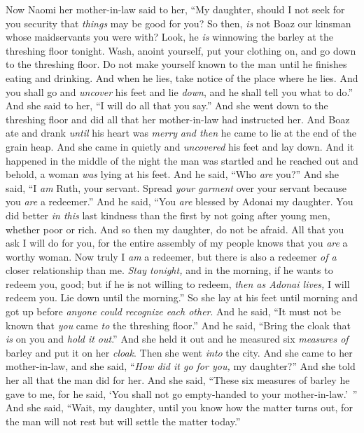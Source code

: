 \begin{biblechapter} %
 Now Naomi her mother-in-law said to her, “My daughter, should I not seek for you security that \textit{things} may be good for you?
\verse So then, \textit{is} not Boaz our kinsman whose maidservants you were with? Look, he \textit{is} winnowing the barley at the threshing floor tonight.
\verse Wash, anoint yourself, put your clothing on, and go down to the threshing floor. Do not make yourself known to the man until he finishes eating and drinking.
\verse And when he lies, take notice of the place where he lies. And you shall go and \textit{uncover} his feet and lie \textit{down}, and he shall tell you what to do.”
\verse And she said to her, “I will do all that you say.”
\verse And she went down to the threshing floor and did all that her mother-in-law had instructed her.
\verse And Boaz ate and drank \textit{until} his heart was \textit{merry} \textit{and then} he came to lie at the end of the grain heap. And she came in quietly and \textit{uncovered} his feet and lay down.
\verse And it happened in the middle of the night the man was startled and he reached out and behold, a woman \textit{was} lying at his feet.
\verse And he said, “Who \textit{are} you?” And she said, “I \textit{am} Ruth, your servant. Spread \textit{your garment} over your servant because you \textit{are} a redeemer.”
\verse And he said, “You \textit{are} blessed by Adonai my daughter. You did better \textit{in this} last kindness than the first by not going after young men, whether poor or rich.
\verse And so then my daughter, do not be afraid. All that you ask I will do for you, for the entire assembly of my people knows that you \textit{are} a worthy woman.
\verse Now truly I \textit{am} a redeemer, but there is also a redeemer \textit{of a} closer relationship than me.
\verse \textit{Stay tonight,} and in the morning, if he wants to redeem you, good; but if he is not willing to redeem, \textit{then as Adonai lives,} I will redeem you. Lie down until the morning.”
\verse So she lay at his feet until morning and got up before \textit{anyone could recognize each other}. And he said, “It must not be known that \textit{you} came \textit{to} the threshing floor.”
\verse And he said, “Bring the cloak that \textit{is} on you and \textit{hold it out}.” And she held it out and he measured six \textit{measures of} barley and put it on her \textit{cloak}. Then she went \textit{into} the city.
\verse And she came to her mother-in-law, and she said, “\textit{How did it go for you,} my daughter?” And she told her all that the man did for her.
\verse And she said, “These six measures of barley he gave to me, for he said, ‘You shall not go empty-handed to your mother-in-law.’ ”
\verse And she said, “Wait, my daughter, until you know how the matter turns out, for the man will not rest but will settle the matter today.”
\end{biblechapter}

